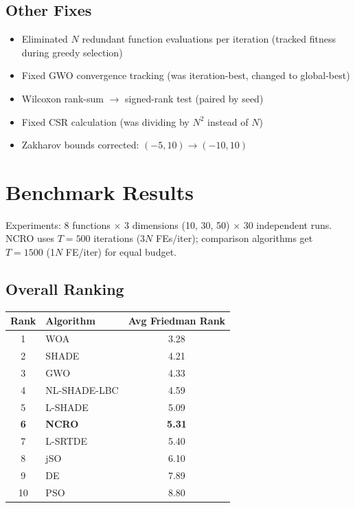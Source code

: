\documentclass[10pt,twocolumn]{article}
\begin{document}
\subsection{Other Fixes}

\begin{itemize}[nosep]
\item Eliminated $N$ redundant function evaluations per iteration (tracked fitness during greedy selection)
\item Fixed GWO convergence tracking (was iteration-best, changed to global-best)
\item Wilcoxon rank-sum $\to$ signed-rank test (paired by seed)
\item Fixed CSR calculation (was dividing by $N^2$ instead of $N$)
\item Zakharov bounds corrected: $(-5, 10) \to (-10, 10)$
\end{itemize}

\section{Benchmark Results}

Experiments: 8 functions $\times$ 3 dimensions (10, 30, 50) $\times$ 30 independent runs. NCRO uses $T=500$ iterations (3$N$ FEs/iter); comparison algorithms get $T=1500$ (1$N$ FE/iter) for equal budget.

\subsection{Overall Ranking}

\begin{center}
\begin{tabular}{clc}
\toprule
Rank & Algorithm & Avg Friedman Rank \\
\midrule
1 & WOA & 3.28 \\
2 & SHADE & 4.21 \\
3 & GWO & 4.33 \\
4 & NL-SHADE-LBC & 4.59 \\
5 & L-SHADE & 5.09 \\
\textbf{6} & \textbf{NCRO} & \textbf{5.31} \\
7 & L-SRTDE & 5.40 \\
8 & jSO & 6.10 \\
9 & DE & 7.89 \\
10 & PSO & 8.80 \\
\bottomrule
\end{tabular}
\end{center}
\end{document}
